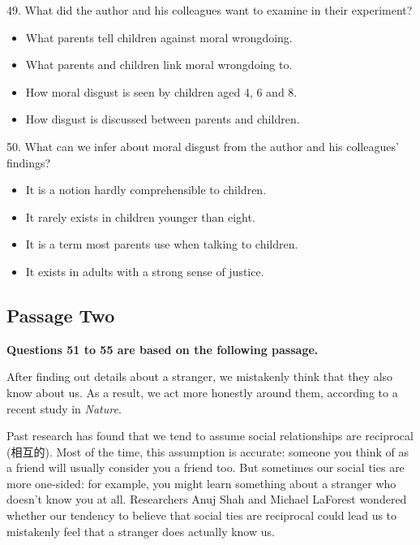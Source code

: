 \documentclass[UTF8,11pt]{ctexart}
\begin{document}
49. What did the author and his colleagues want to examine in their experiment?


\begin{itemize}[leftmargin=2em,itemsep=.2em,topsep=.4em]\item[A.] What parents tell children against moral wrongdoing.
\item[B.] What parents and children link moral wrongdoing to.
\item[C.] How moral disgust is seen by children aged 4, 6 and 8.
\item[D.] How disgust is discussed between parents and children.
\end{itemize}

50. What can we infer about moral disgust from the author and his colleagues’ findings?


\begin{itemize}[leftmargin=2em,itemsep=.2em,topsep=.4em]\item[A.] It is a notion hardly comprehensible to children.
\item[B.] It rarely exists in children younger than eight.
\item[C.] It is a term most parents use when talking to children.
\item[D.] It exists in adults with a strong sense of justice.
\end{itemize}

\subsection*{\textbf{Passage Two}}


\textbf{Questions 51 to 55 are based on the following passage.}


After finding out details about a stranger, we mistakenly think that they also know about us. As a result, we act more honestly around them, according to a recent study in \textit{Nature}.


Past research has found that we tend to assume social relationships are reciprocal (相互的). Most of the time, this assumption is accurate: someone you think of as a friend will usually consider you a friend too. But sometimes our social ties are more one-sided: for example, you might learn something about a stranger who doesn’t know you at all. Researchers Anuj Shah and Michael LaForest wondered whether our tendency to believe that social ties are reciprocal could lead us to mistakenly feel that a stranger does actually know us.
\end{document}
